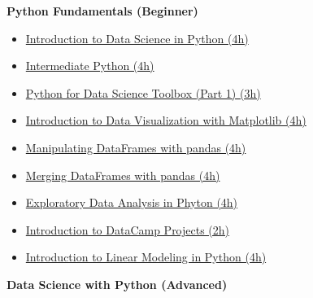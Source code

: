 \documentclass[
  11pt,
]{article}
\providecommand{\tightlist}{%
  \setlength{\itemsep}{0pt}\setlength{\parskip}{0pt}}
\newenvironment{tipsp}[1]
  {
  \begin{itemize}
  \footnotesize
  \renewcommand{\labelitemi}{
    \raisebox{-.7\height}[0pt][0pt]{
      {\setkeys{Gin}{width=3em,keepaspectratio}
        \texttt{[image: images/\#1.png]}}
    }
  }
  \setlength{\fboxsep}{1em}
  \begin{pbox}
  \item
  }
  {
  \end{pbox}
  \end{itemize}
  }
\begin{document}
\begin{tipsp}p

\textbf{Python Fundamentals (Beginner) }

\begin{itemize}
\tightlist
\item
  \href{https://www.datacamp.com/courses/introduction-to-data-science-in-python}{Introduction to Data Science in Python (4h)}
\item
  \href{https://www.datacamp.com/courses/intermediate-python-for-data-science}{Intermediate Python (4h)}
\item
  \href{https://www.datacamp.com/courses/python-data-science-toolbox-part-1}{Python for Data Science Toolbox (Part 1) (3h)}
\item
  \href{https://www.datacamp.com/courses/introduction-to-matplotlib}{Introduction to Data Visualization with Matplotlib (4h)}
\item
  \href{https://www.datacamp.com/courses/manipulating-dataframes-with-pandas}{Manipulating DataFrames with pandas (4h)}
\item
  \href{https://www.datacamp.com/courses/merging-dataframes-with-pandas}{Merging DataFrames with pandas (4h)}
\item
  \href{https://www.datacamp.com/courses/exploratory-data-analysis-in-python}{Exploratory Data Analysis in Phyton (4h)}
\item
  \href{https://www.datacamp.com/projects/33}{Introduction to DataCamp Projects (2h)}
\item
  \href{https://www.datacamp.com/courses/introduction-to-linear-modeling-in-python}{Introduction to Linear Modeling in Python (4h)}
\end{itemize}

\textbf{Data Science with Python (Advanced) }


\end{tipsp}
\end{document}
